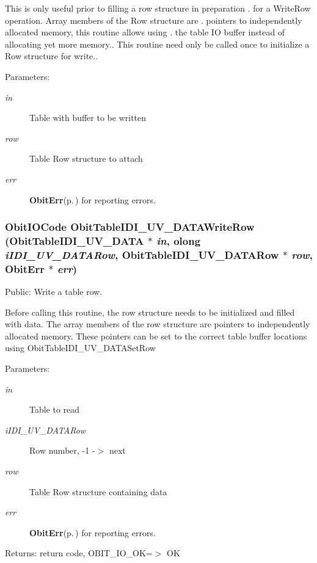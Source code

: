 This is only useful prior to filling a row structure in preparation . for a Write\-Row operation. Array members of the Row structure are . pointers to independently allocated memory, this routine allows using . the table IO buffer instead of allocating yet more memory.. This routine need only be called once to initialize a Row structure for write.. \begin{Desc}
\item[Parameters:]
\begin{description}
\item[{\em in}]Table with buffer to be written \item[{\em row}]Table Row structure to attach \item[{\em err}]{\bf Obit\-Err}{\rm (p.\,\pageref{structObitErr})} for reporting errors. \end{description}
\end{Desc}
\subsubsection{\setlength{\rightskip}{0pt plus 5cm}Obit\-IOCode Obit\-Table\-IDI\_\-UV\_\-DATAWrite\-Row ({\bf Obit\-Table\-IDI\_\-UV\_\-DATA} $\ast$ {\em in}, {\bf olong} {\em i\-IDI\_\-UV\_\-DATARow}, {\bf Obit\-Table\-IDI\_\-UV\_\-DATARow} $\ast$ {\em row}, {\bf Obit\-Err} $\ast$ {\em err})}\label{ObitTableIDI__UV__DATA_8c_a24}


Public: Write a table row. 

Before calling this routine, the row structure needs to be initialized and filled with data. The array members of the row structure are pointers to independently allocated memory. These pointers can be set to the correct table buffer locations using Obit\-Table\-IDI\_\-UV\_\-DATASet\-Row \begin{Desc}
\item[Parameters:]
\begin{description}
\item[{\em in}]Table to read \item[{\em i\-IDI\_\-UV\_\-DATARow}]Row number, -1 -$>$ next \item[{\em row}]Table Row structure containing data \item[{\em err}]{\bf Obit\-Err}{\rm (p.\,\pageref{structObitErr})} for reporting errors. \end{description}
\end{Desc}
\begin{Desc}
\item[Returns:]return code, OBIT\_\-IO\_\-OK=$>$ OK \end{Desc}
